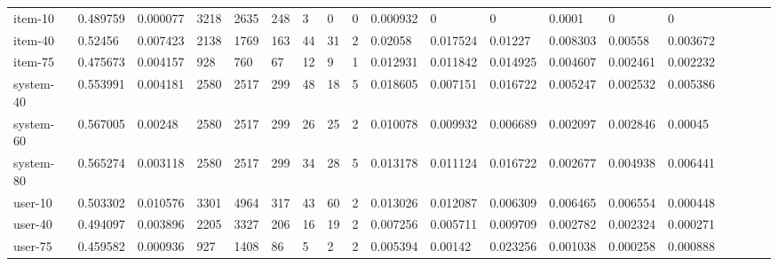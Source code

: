 \begin{table}
{\begin{tabular}{*{19}l}
item-10 &   0.489759 &  0.000077 &  3218 &  2635 &  248 &   3 & 0 & 0 & 0.000932 &  0 & 0 & 0.0001 &    0 & 0 &  \\
item-40 &   0.52456 &   0.007423 &  2138 &  1769 &  163 &   44 &    31 &    2 & 0.02058 &   0.017524 &  0.01227 &   0.008303 &  0.00558 &   0.003672 &   \\
item-75 &   0.475673 &  0.004157 &  928 &   760 &   67 &    12 &    9 & 1 & 0.012931 &  0.011842 &  0.014925 &  0.004607 &  0.002461 &  0.002232 &   \\
system-40   &   0.553991 &  0.004181 &  2580 &  2517 &  299 &   48 &    18 &    5 & 0.018605 &  0.007151 &  0.016722 &  0.005247 &  0.002532 &  0.005386 &   \\
system-60   &   0.567005 &  0.00248 &   2580 &  2517 &  299 &   26 &    25 &    2 & 0.010078 &  0.009932 &  0.006689 &  0.002097 &  0.002846 &  0.00045 &    \\
system-80   &   0.565274 &  0.003118 &  2580 &  2517 &  299 &   34 &    28 &    5 & 0.013178 &  0.011124 &  0.016722 &  0.002677 &  0.004938 &  0.006441 &   \\
user-10 &   0.503302 &  0.010576 &  3301 &  4964 &  317 &   43 &    60 &    2 & 0.013026 &  0.012087 &  0.006309 &  0.006465 &  0.006554 &  0.000448 &   \\
user-40 &   0.494097 &  0.003896 &  2205 &  3327 &  206 &   16 &    19 &    2 & 0.007256 &  0.005711 &  0.009709 &  0.002782 &  0.002324 &  0.000271 &   \\
user-75 &   0.459582 &  0.000936 &  927 &   1408 &  86 &    5 & 2 & 2 & 0.005394 &  0.00142 &   0.023256 &  0.001038 &  0.000258 &  0.000888 &   \\


\end{tabular}}
\end{table}
